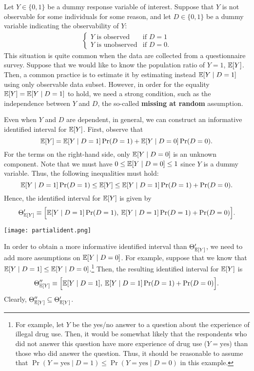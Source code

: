 \documentclass[11pt, A4paper, openany, uplatex]{book}
\begin{document}
\begin{example}\upshape
	Let $Y \in \{0, 1\}$ be a dummy response variable of interest.
	Suppose that $Y$ is not observable for some individuals for some reason, and let $D \in \{0, 1\}$ be a dummy variable indicating the observability of $Y$:
	\begin{align*}
	\left\{ 
	\begin{array}{ll}
	\text{$Y$ is observed} & \text{if $D = 1$}\\
	\text{$Y$ is unobserved} & \text{if $D = 0$}.
	\end{array}\right.
	\end{align*}
	This situation is quite common when the data are collected from a questionnaire survey.
	Suppose that we would like to know the population ratio of $Y = 1$, $\mathbb{E} [Y]$.
	Then, a common practice is to estimate it by estimating instead $\mathbb{E} [Y \mid D = 1]$ using only observable data subset.
	However, in order for the equality $\mathbb{E} [Y] = \mathbb{E}[Y \mid D = 1]$ to hold, we need a strong condition, such as the independence 	between $Y$ and $D$, the so-called \textbf{missing at random} assumption.

	Even when $Y$ and $D$ are dependent, in general, we can construct an informative identified interval for $\mathbb{E} [Y]$.
	First, observe that
	\[
		\mathbb{E}[Y] = \mathbb{E}[Y \mid D = 1] \Pr(D = 1) + \mathbb{E}[Y \mid D = 0] \Pr(D = 0).
	\]
	For the terms on the right-hand side, only $\mathbb{E} [Y \mid D = 0]$ is an unknown component.
	Note that we must have $0 \le \mathbb{E}[Y \mid D = 0] \le 1$ since $Y$ is a dummy variable.
	Thus, the following inequalities must hold:
	\[
		\mathbb{E}[Y \mid D = 1] \Pr(D = 1) \le \mathbb{E}[Y] \le \mathbb{E}[Y \mid D = 1] \Pr(D = 1) + \Pr(D = 0).
	\]
	Hence, the identified interval for $\mathbb{E} [Y ]$ is given by
	\[
		\Theta'_{\mathbb{E}[Y]} \equiv \Big[ \mathbb{E}[Y \mid D = 1] \Pr(D = 1), \: \mathbb{E}[Y \mid D = 1] \Pr(D = 1) + \Pr(D = 0) \Big] .
	\]

	\begin{center}
		\texttt{[image: partialident.png]}
	\end{center}

	In order to obtain a more informative identified interval than $\Theta'_{\mathbb{E}[Y]}$, we need to add more assumptions on $\mathbb{E} [Y \mid D = 0]$.
	For example, suppose that we know that $\mathbb{E} [Y \mid D = 1] \le \mathbb{E}[Y \mid D = 0]$.\footnote{
		For example, let $Y$ be the yes/no answer to a question about the experience of illegal drug use.
		Then, it would be somewhat likely that the respondents who did not answer this question have more experience of drug use ($Y = \text{yes}$) than those who did answer the question.
		Thus, it should be reasonable to assume that $\Pr(Y = \text{yes} \mid D = 1) \le \Pr(Y = \text{yes} \mid D = 0)$ in this example.
	}
	Then, the resulting identified interval for $\mathbb{E} [Y ]$ is
	\[
	\Theta^{\prime\prime}_{\mathbb{E}[Y ]} \equiv \Big[ \mathbb{E}[Y \mid D = 1], \: \mathbb{E}[ Y \mid D = 1] \Pr(D = 1) + \Pr(D = 0) \Big].
	\]
	Clearly, $\Theta^{\prime\prime}_{\mathbb{E}[ Y ]} \subseteq \Theta'_{\mathbb{E}[ Y ]}$.
\end{example}
\end{document}
